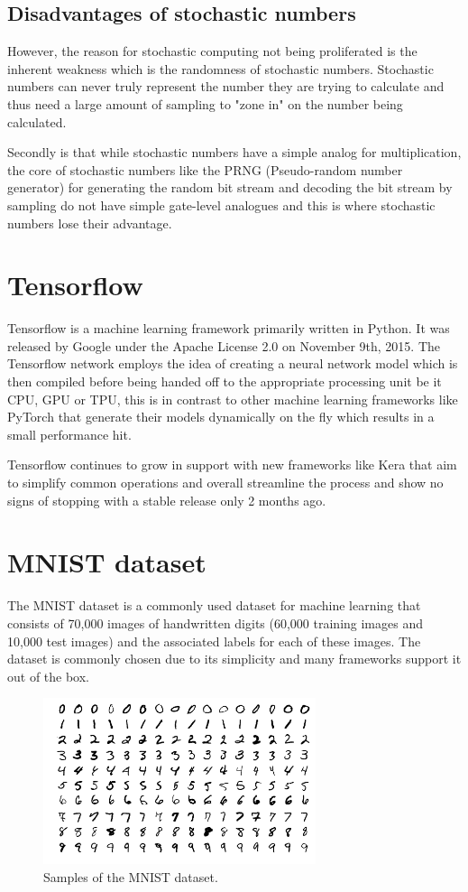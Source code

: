 \documentclass[a4paper,oneside,phd,etd]{BYUPhys}
\begin{document}
\subsection{Disadvantages of stochastic numbers}
However, the reason for stochastic computing not being proliferated is the inherent weakness which is the randomness of stochastic numbers. Stochastic numbers can never truly represent the number they are trying to calculate and thus need a large amount of sampling to "zone in" on the number being calculated.

Secondly is that while stochastic numbers have a simple analog for multiplication, the core of stochastic numbers like the PRNG (Pseudo-random number generator) for generating the random bit stream and decoding the bit stream by sampling do not have simple gate-level analogues and this is where stochastic numbers lose their advantage.

\section{Tensorflow}
Tensorflow\cite{tensorflow} is a machine learning framework primarily written in Python. It was released by Google under the Apache License 2.0 on November 9th, 2015. The Tensorflow network employs the idea of creating a neural network model which is then compiled before being handed off to the appropriate processing unit be it CPU, GPU or TPU, this is in contrast to other machine learning frameworks like PyTorch that generate their models dynamically on the fly which results in a small performance hit.

Tensorflow continues to grow in support with new frameworks like Kera that aim to simplify common operations and overall streamline the process and show no signs of stopping with a stable release only 2 months ago.

\section{MNIST dataset}
The MNIST dataset\cite{lecun-website} is a commonly used dataset for machine learning that consists of 70,000 images of handwritten digits (60,000 training images and 10,000 test images) and the associated labels for each of these images. The dataset is commonly chosen due to its simplicity and many frameworks support it out of the box.
\begin{figure}[H]
\centering
\includegraphics[width=8cm]{pictures/mnist.png}
\caption{Samples of the MNIST dataset\cite{fig:mnist}.}
\label{fig:mnist}
\end{figure}
\end{document}
